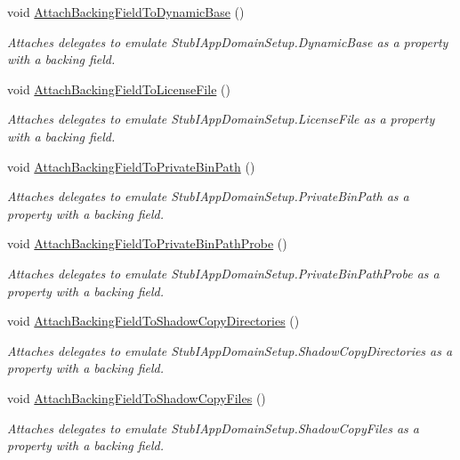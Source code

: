 \begin{DoxyCompactItemize}
void \hyperlink{class_system_1_1_fakes_1_1_stub_i_app_domain_setup_a909c80d83e04dc2cf4ba33e8b9992c60}{Attach\-Backing\-Field\-To\-Dynamic\-Base} ()
\begin{DoxyCompactList}\small\item\em Attaches delegates to emulate Stub\-I\-App\-Domain\-Setup.\-Dynamic\-Base as a property with a backing field.\end{DoxyCompactList}\item 
void \hyperlink{class_system_1_1_fakes_1_1_stub_i_app_domain_setup_a2c0f225e514f81984bba0c40169221a7}{Attach\-Backing\-Field\-To\-License\-File} ()
\begin{DoxyCompactList}\small\item\em Attaches delegates to emulate Stub\-I\-App\-Domain\-Setup.\-License\-File as a property with a backing field.\end{DoxyCompactList}\item 
void \hyperlink{class_system_1_1_fakes_1_1_stub_i_app_domain_setup_a2e4a4b18abdc8b35b7d264afe9d96a06}{Attach\-Backing\-Field\-To\-Private\-Bin\-Path} ()
\begin{DoxyCompactList}\small\item\em Attaches delegates to emulate Stub\-I\-App\-Domain\-Setup.\-Private\-Bin\-Path as a property with a backing field.\end{DoxyCompactList}\item 
void \hyperlink{class_system_1_1_fakes_1_1_stub_i_app_domain_setup_a338a6aa93653af73701e92c9133f4058}{Attach\-Backing\-Field\-To\-Private\-Bin\-Path\-Probe} ()
\begin{DoxyCompactList}\small\item\em Attaches delegates to emulate Stub\-I\-App\-Domain\-Setup.\-Private\-Bin\-Path\-Probe as a property with a backing field.\end{DoxyCompactList}\item 
void \hyperlink{class_system_1_1_fakes_1_1_stub_i_app_domain_setup_a21d6db0ae94ad49afdde2cd119384229}{Attach\-Backing\-Field\-To\-Shadow\-Copy\-Directories} ()
\begin{DoxyCompactList}\small\item\em Attaches delegates to emulate Stub\-I\-App\-Domain\-Setup.\-Shadow\-Copy\-Directories as a property with a backing field.\end{DoxyCompactList}\item 
void \hyperlink{class_system_1_1_fakes_1_1_stub_i_app_domain_setup_ae87991affec8af005b91df104ecbe290}{Attach\-Backing\-Field\-To\-Shadow\-Copy\-Files} ()
\begin{DoxyCompactList}\small\item\em Attaches delegates to emulate Stub\-I\-App\-Domain\-Setup.\-Shadow\-Copy\-Files as a property with a backing field.\end{DoxyCompactList}\end{DoxyCompactItemize}

